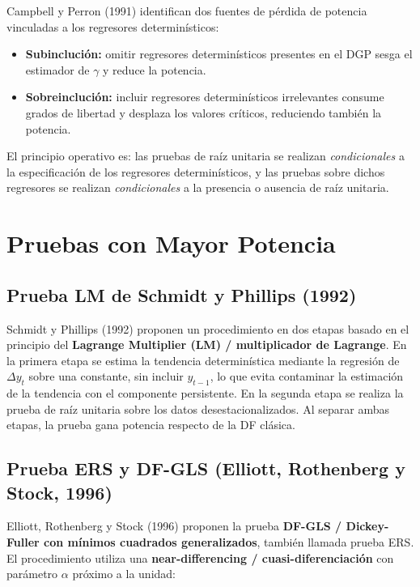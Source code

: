\documentclass[12pt]{article}
\begin{document}
Campbell y Perron (1991) identifican dos fuentes de p\'erdida de potencia
vinculadas a los regresores determin\'isticos:

\begin{itemize}
  \item \textbf{Subincluci\'on:} omitir regresores determin\'isticos
        presentes en el DGP sesga el estimador de $\gamma$ y reduce la
        potencia.
  \item \textbf{Sobreincluci\'on:} incluir regresores determin\'isticos
        irrelevantes consume grados de libertad y desplaza los valores
        cr\'iticos, reduciendo tambi\'en la potencia.
\end{itemize}

El principio operativo es: las pruebas de ra\'iz unitaria se realizan
\emph{condicionales} a la especificaci\'on de los regresores
determin\'isticos, y las pruebas sobre dichos regresores se realizan
\emph{condicionales} a la presencia o ausencia de ra\'iz unitaria.

\section{Pruebas con Mayor Potencia}

\subsection{Prueba LM de Schmidt y Phillips (1992)}

Schmidt y Phillips (1992) proponen un procedimiento en dos etapas basado
en el principio del \textbf{Lagrange Multiplier (LM) / multiplicador de
Lagrange}. En la primera etapa se estima la tendencia determin\'istica
mediante la regresi\'on de $\Delta y_t$ sobre una constante, sin incluir
$y_{t-1}$, lo que evita contaminar la estimaci\'on de la tendencia con
el componente persistente. En la segunda etapa se realiza la prueba de
ra\'iz unitaria sobre los datos desestacionalizados. Al separar ambas
etapas, la prueba gana potencia respecto de la DF cl\'asica.

\subsection{Prueba ERS y DF-GLS (Elliott, Rothenberg y Stock, 1996)}

Elliott, Rothenberg y Stock (1996) proponen la prueba
\textbf{DF-GLS / Dickey-Fuller con m\'inimos cuadrados generalizados},
tambi\'en llamada prueba ERS. El procedimiento utiliza una
\textbf{near-differencing / cuasi-diferenciaci\'on} con par\'ametro
$\alpha$ pr\'oximo a la unidad:
\end{document}
